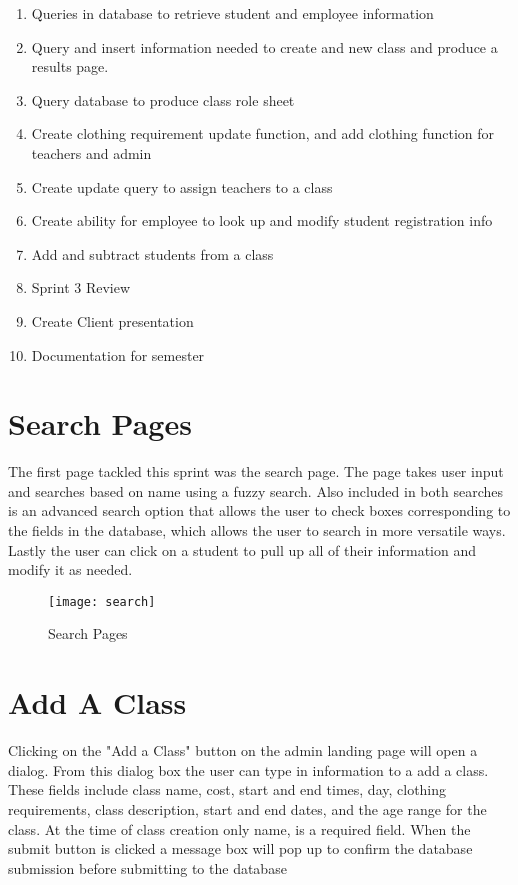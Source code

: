 \documentclass[11pt]{book}
\begin{document}
\begin{enumerate}
\item Queries in database to retrieve student and employee information
\item Query and insert information needed to create and new class and produce a results page.
\item Query database to produce class role sheet
\item Create clothing requirement update function, and add clothing function for teachers and admin
\item Create update query to assign teachers to a class
\item Create ability for employee to look up and modify student registration info
\item Add and subtract students from a class
\item Sprint 3 Review
\item Create Client presentation
\item Documentation for semester
\end{enumerate}

\section{Search Pages}
The first page tackled this sprint was the search page. The page takes user input and searches based on name using a fuzzy search. Also included in both searches is an advanced search option that allows the user to check boxes corresponding to the fields in the database, which allows the user to search in more versatile ways. Lastly the user can click on a student to pull up all of their information and modify it as needed.


\begin{figure}
\caption{Search Pages}
\centering
\texttt{[image: search]}
\end{figure}

\section{Add A Class}
Clicking on the "Add a Class" button on the admin landing page will open a dialog. From this dialog box the user can type in information to a add a class. These fields include class name, cost, start and end times, day, clothing requirements, class description, start and end dates, and the age range for the class.  At the time of class creation only name, is a required field. When the submit button is clicked a message box will pop up to confirm the database submission before submitting to the database  
\end{document}
